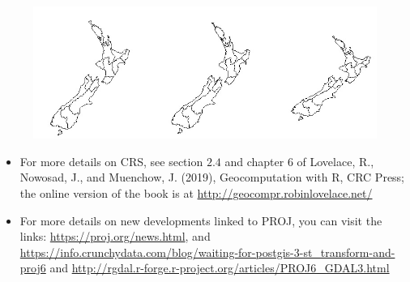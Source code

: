 \documentclass[11pt]{beamer}
\begin{document}
\begin{frame}
\begin{figure}
\includegraphics[scale=0.8]{NZ.jpg}
\end{figure}
\end{frame}



\begin{frame}

\begin{itemize} \setlength\itemsep{\fill}

\item For more details on CRS, see section $2.4$ and chapter 6 of Lovelace, R., Nowosad, J., and Muenchow, J. (2019), Geocomputation with R, CRC Press; the online version of the book is at \url{http://geocompr.robinlovelace.net/}
\item For  more details on new developments linked to PROJ, you can visit the links:
\url{https://proj.org/news.html}, and \url{https://info.crunchydata.com/blog/waiting-for-postgis-3-st_transform-and-proj6}  and \url{http://rgdal.r-forge.r-project.org/articles/PROJ6_GDAL3.html}
\end{itemize}
\end{frame}





\end{document}
